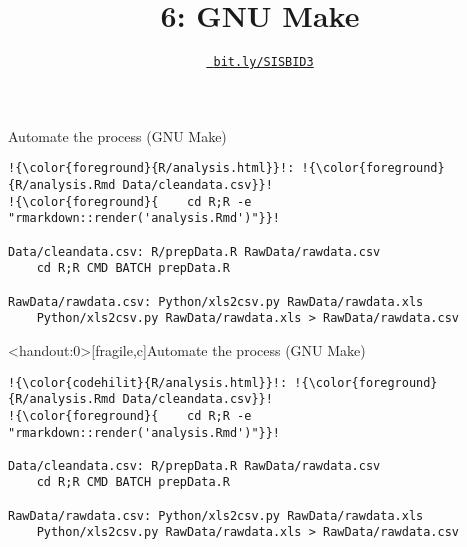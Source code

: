 \documentclass[12pt,t]{beamer}
\title{6: GNU Make}
\author{}
\date{\href{https://bit.ly/SISBID3}{\tt \color{foreground} bit.ly/SISBID3}}
\begin{document}
{
 }





\begin{frame}[fragile,c]{Automate the process (GNU Make)}

\begin{center}
\begin{minipage}[c]{10.8cm}
\begin{semiverbatim}
\begin{lstlisting}[escapechar=!,linewidth=10.8cm]
!{\color{foreground}{R/analysis.html}}!: !{\color{foreground}{R/analysis.Rmd Data/cleandata.csv}}!
!{\color{foreground}{    cd R;R -e "rmarkdown::render('analysis.Rmd')"}}!

Data/cleandata.csv: R/prepData.R RawData/rawdata.csv
    cd R;R CMD BATCH prepData.R

RawData/rawdata.csv: Python/xls2csv.py RawData/rawdata.xls
    Python/xls2csv.py RawData/rawdata.xls > RawData/rawdata.csv
\end{lstlisting}
\end{semiverbatim}
\end{minipage}
\end{center}

\end{frame}


\begin{frame}<handout:0>[fragile,c]{Automate the process (GNU Make)}

\addtocounter{framenumber}{-1}

\begin{center}
\begin{minipage}[c]{10.8cm}
\begin{semiverbatim}
\begin{lstlisting}[escapechar=!,linewidth=10.8cm]
!{\color{codehilit}{R/analysis.html}}!: !{\color{foreground}{R/analysis.Rmd Data/cleandata.csv}}!
!{\color{foreground}{    cd R;R -e "rmarkdown::render('analysis.Rmd')"}}!

Data/cleandata.csv: R/prepData.R RawData/rawdata.csv
    cd R;R CMD BATCH prepData.R

RawData/rawdata.csv: Python/xls2csv.py RawData/rawdata.xls
    Python/xls2csv.py RawData/rawdata.xls > RawData/rawdata.csv
\end{lstlisting}
\end{semiverbatim}
\end{minipage}
\end{center}

\end{frame}
\end{document}
